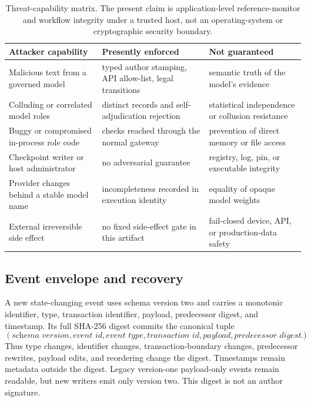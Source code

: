 \begin{table}[htbp]
  \centering
  \small
  \begin{tabularx}{\textwidth}{@{}p{}XX@{}}
    \toprule
    \textbf{Attacker capability} & \textbf{Presently enforced} &
    \textbf{Not guaranteed} \\
    \midrule
    Malicious text from a governed model &
      typed author stamping, API allow-list, legal transitions &
      semantic truth of the model's evidence \\
    Colluding or correlated model roles &
      distinct records and self-adjudication rejection &
      statistical independence or collusion resistance \\
    Buggy or compromised in-process role code &
      checks reached through the normal gateway &
      prevention of direct memory or file access \\
    Checkpoint writer or host administrator &
      no adversarial guarantee &
      registry, log, pin, or executable integrity \\
    Provider changes behind a stable model name &
      incompleteness recorded in execution identity &
      equality of opaque model weights \\
    External irreversible side effect &
      no fixed side-effect gate in this artifact &
      fail-closed device, API, or production-data safety \\
    \bottomrule
  \end{tabularx}
  \caption{Threat-capability matrix. The present claim is application-level
  reference-monitor and workflow integrity under a trusted host, not an
  operating-system or cryptographic security boundary.}
  \label{tab:threat-capability}
\end{table}

\subsection{Event envelope and recovery}\label{sec:appendix:events}

A new state-changing event uses schema version two and carries a monotonic
identifier, type, transaction identifier, payload, predecessor digest, and
timestamp. Its full SHA-256 digest commits the canonical tuple
\[
  (\textit{schema version},\textit{event id},\textit{event type},
  \textit{transaction id},\textit{payload},\textit{predecessor digest}).
\]
Thus type changes, identifier changes, transaction-boundary changes,
predecessor rewrites, payload edits, and reordering change the digest.
Timestamps remain metadata outside the digest. Legacy version-one
payload-only events remain readable, but new writers emit only version two.
This digest is not an author signature.

